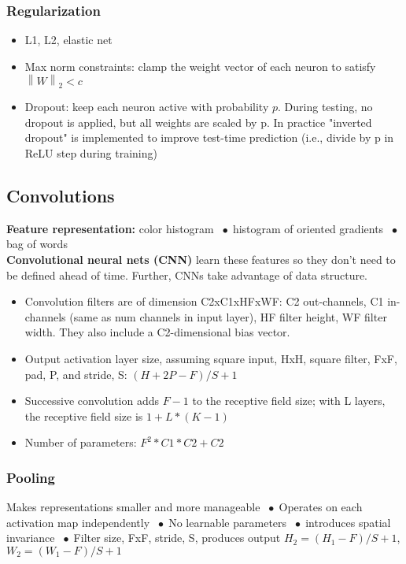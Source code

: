 \documentclass[9pt]{extarticle}
\newcommand{\norm}[2]{\left\lVert#1\right\rVert_#2}
\newcommand*\bspace{$\; \bullet \;$}
\begin{document}
\subsubsection{Regularization}
\begin{itemize}
    \item L1, L2, elastic net
    \item Max norm constraints: clamp the weight vector of each neuron to satisfy $\norm{W}{2} < c$
    \item Dropout: keep each neuron active with probability $p$. During testing, no dropout is applied, but all weights are scaled by p. In practice "inverted dropout" is implemented to improve test-time prediction (i.e., divide by p in ReLU step during training)
\end{itemize}



\subsection{Convolutions}
\textbf{Feature representation:} color histogram \bspace histogram of oriented gradients \bspace bag of words\\
\textbf{Convolutional neural nets (CNN)} learn these features so they don't need to be defined ahead of time. Further, CNNs take advantage of data structure.
\begin{itemize}
    \item Convolution filters are of dimension C2xC1xHFxWF: C2 out-channels, C1 in-channels (same as num channels in input layer), HF filter height, WF filter width. They also include a C2-dimensional bias vector.
    \item Output activation layer size, assuming square input, HxH, square filter, FxF, pad, P, and stride, S: $(H + 2P - F) / S + 1$
    \item Successive convolution adds $F-1$ to the receptive field size; with L layers, the receptive field size is $1 + L*(K-1)$
    \item Number of parameters: $F^2*C1*C2 + C2$
\end{itemize}

\subsubsection{Pooling}
Makes representations smaller and more manageable \bspace Operates on each activation map independently \bspace No learnable parameters \bspace introduces spatial invariance \bspace Filter size, FxF, stride, S, produces output $H_2 = (H_1 - F)/S + 1$, $W_2 = (W_1 - F)/S + 1$
\end{document}
